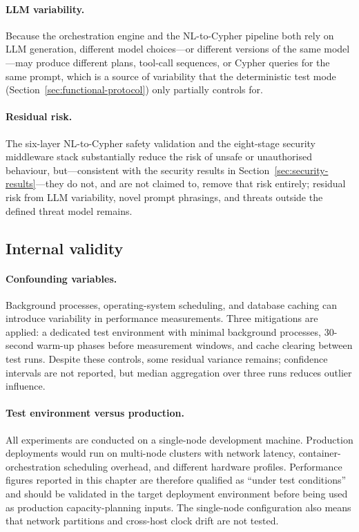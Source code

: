 \documentclass[a4paper,noexaminfo]{sapthesis}
\begin{document}
\paragraph{LLM variability.}
Because the orchestration engine and the NL-to-Cypher pipeline both rely
on LLM generation, different model choices---or different versions of
the same model---may produce different plans, tool-call sequences, or
Cypher queries for the same prompt, which is a source of variability that
the deterministic test mode (Section~\ref{sec:functional-protocol})
only partially controls for.

\paragraph{Residual risk.}
The six-layer NL-to-Cypher safety validation and the eight-stage security
middleware stack substantially reduce the risk of unsafe or unauthorised
behaviour, but---consistent with the security results in
Section~\ref{sec:security-results}---they do not, and are not claimed to,
remove that risk entirely; residual risk from LLM variability, novel
prompt phrasings, and threats outside the defined threat model remains.

\subsection{Internal validity}

\paragraph{Confounding variables.}
Background processes, operating-system scheduling, and database caching
can introduce variability in performance measurements.  Three mitigations
are applied: a dedicated test environment with minimal background
processes, 30-second warm-up phases before measurement windows, and
cache clearing between test runs.  Despite these controls, some residual
variance remains; confidence intervals are not reported, but median
aggregation over three runs reduces outlier influence.

\paragraph{Test environment versus production.}
All experiments are conducted on a single-node development machine.
Production deployments would run on multi-node clusters with network
latency, container-orchestration scheduling overhead, and different
hardware profiles.  Performance figures reported in this chapter are
therefore qualified as ``under test conditions'' and should be validated
in the target deployment environment before being used as production
capacity-planning inputs.  The single-node configuration also means that
network partitions and cross-host clock drift are not tested.
\end{document}
